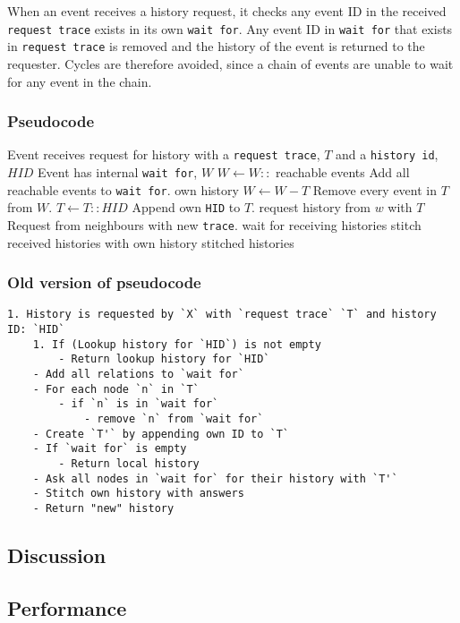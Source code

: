 When an event receives a history request, it checks any event ID in the received \texttt{request trace} exists in its own \texttt{wait for}. Any event ID in \texttt{wait for} that exists in \texttt{request trace} is removed and the history of the event is returned to the requester. 
Cycles are therefore avoided, since a chain of events are unable to wait for any event in the chain. \bigskip 


\subsubsection*{Pseudocode}
\begin{algorithmic}
	\State Event receives request for history with a \texttt{request trace}, $T$ and a \texttt{history id}, $HID$
	\State Event has internal \texttt{wait for}, $W$
	\State
	\State $W\gets W::$ reachable events \Comment Add all reachable events to \texttt{wait for}.
	\Return own history
	\Else
	\State $W\gets W-T$ \Comment Remove every event in $T$ from $W$.
	\State $T\gets T::HID$ \Comment Append own \texttt{HID} to $T$.
	\State
	\State request history from $w$ with $T$ \Comment Request from neighbours with new \texttt{trace}.
	\EndFor
	\State wait for receiving histories
	\State stitch received histories with own history
	\State
	\Return stitched histories
	\EndIf
\end{algorithmic}

\subsubsection*{Old version of pseudocode}
\begin{lstlisting}[breaklines=true]
 1. History is requested by `X` with `request trace` `T` and history ID: `HID`
    1. If (Lookup history for `HID`) is not empty
        - Return lookup history for `HID`
    - Add all relations to `wait for`
    - For each node `n` in `T`
        - if `n` is in `wait for`
            - remove `n` from `wait for`
    - Create `T'` by appending own ID to `T`
    - If `wait for` is empty
        - Return local history
    - Ask all nodes in `wait for` for their history with `T'`
    - Stitch own history with answers
    - Return "new" history
\end{lstlisting}

\subsection{Discussion} %
\subsection{Performance} %